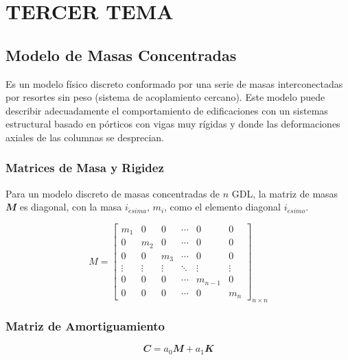 \section{TERCER TEMA}
 
	\subsection{Modelo de Masas Concentradas}
	
Es un modelo físico discreto conformado por una serie de masas interconectadas por resortes sin peso (sistema de acoplamiento cercano). Este modelo puede describir adecuadamente el comportamiento de edificaciones con un sistemas estructural basado en pórticos con vigas muy rígidas y donde las deformaciones axiales de las columnas se desprecian.

		\subsubsection{Matrices de Masa y Rigidez}

Para un modelo discreto de masas concentradas de $n$ GDL, la matriz de masas $\mathbfit{M}$ es diagonal, con la masa $i_{\acute{e}sima}$, $m_{i}$, como el elemento diagonal $i_{\acute{e}simo}$.

\begin{equation}\label{Eq18}
M=\begin{bmatrix}
m_{1} & 0 & 0 & \cdots & 0 & 0 \\ 
0 & m_{2} & 0 & \cdots & 0 & 0\\ 
0 & 0 & m_{3} & \cdots & 0 & 0\\ 
\vdots & \vdots & \vdots &\ddots  &\vdots  &\vdots \\ 
0 & 0 & 0 & \cdots & m_{n-1}& 0\\ 
0 & 0 & 0 & \cdots & 0 & m_{n}
\end{bmatrix}_{n\times n}
\end{equation}



		\subsubsection{Matriz de Amortiguamiento}

\begin{equation}\label{Eq21}
\mathbfit{C}=a_{0}\mathbfit{M}+a_{1}\mathbfit{K}
\end{equation}






